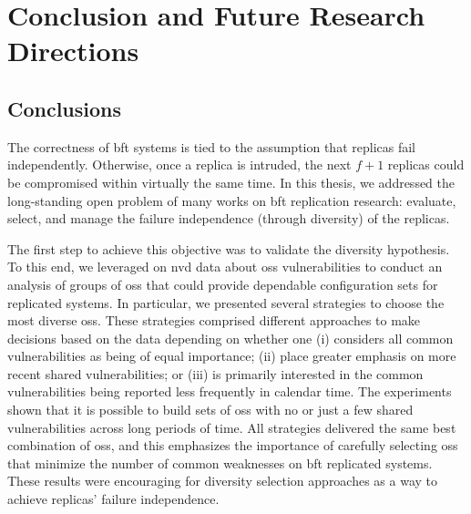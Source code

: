 \chapter{Conclusion and Future Research Directions}
\label{chap:conclusion}

\section{Conclusions}
The correctness of \gls{bft} systems is tied to the assumption that replicas fail independently. 
Otherwise, once a replica is intruded, the next $f+1$ replicas could be compromised within virtually the same time.
In this thesis, we addressed the long-standing open problem of many works on \gls{bft} replication research: evaluate, select, and manage the failure independence (through diversity) of the replicas.


The first step to achieve this objective was to validate the diversity hypothesis.  
To this end, we leveraged on \gls{nvd} data about \glspl{os} vulnerabilities to conduct an analysis of groups of \glspl{os} that could provide dependable configuration sets for replicated systems.
In particular, we presented several strategies to choose the most diverse \glspl{os}.
These strategies comprised different approaches to make decisions based on the data depending on whether one (i) considers all common vulnerabilities as being of equal importance; (ii) place greater emphasis on more recent shared vulnerabilities; or (iii) is primarily interested in the common vulnerabilities being reported less frequently in calendar time.
The experiments shown that it is possible to build sets of \glspl{os} with no or just a few shared vulnerabilities across long periods of time.
All strategies delivered the same best combination of \glspl{os}, and this emphasizes the importance of carefully selecting \glspl{os} that minimize the number of common weaknesses on \gls{bft} replicated systems.
These results were encouraging for diversity selection approaches as a way to achieve replicas' failure independence.



